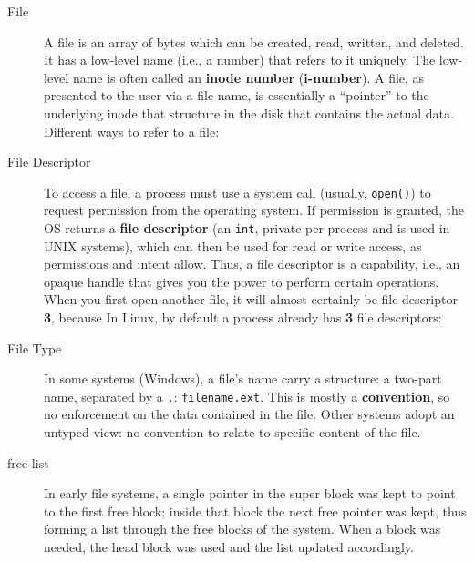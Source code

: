 \begin{description}
\item[File] A file is an array of bytes which can be created, read, written, and deleted. It has a low-level name (i.e., a number) that refers to it uniquely. The low-level name is often called an \textbf{inode number} (\textbf{i-number}).  A file, as presented to the user via a file name, is essentially a “pointer” to the underlying inode that structure in the disk that contains the actual data. Different ways to refer to a file:

\item[File Descriptor] To access a file, a process must use a system call (usually, \texttt{open()}) to request permission from the operating system. If permission is granted, the OS returns a \textbf{file descriptor} (an \texttt{int}, private per process and is used in UNIX systems), which can then be used for read or write access, as permissions and intent allow.  Thus, a file descriptor is a capability, i.e., an opaque handle that gives you the power to perform certain operations.  When you first open another file, it will almost certainly be file descriptor \textbf{3}, because In Linux, by default a process already has \textbf{3} file descriptors:


\item[File Type]  In some systems (Windows), a file's name carry a structure: a two-part name, separated by a \texttt{.}: \texttt{filename.ext}. This is mostly a \textbf{convention}, so no enforcement on the data contained in the file. Other systems adopt an untyped view: no convention to relate to specific content of the file.

\item[free list] In early file systems, a single pointer in the super block was kept to point to the first free block; inside that block the next free pointer was kept, thus forming a list through the free blocks of the system. When a block was needed, the head block was used and the list updated accordingly.


\end{description}
